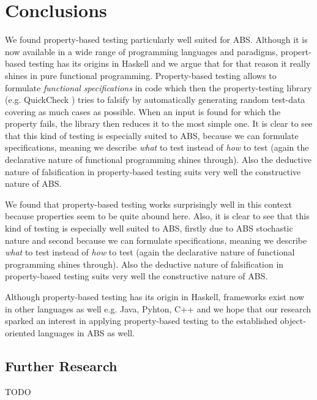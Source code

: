\section{Conclusions}
\label{sec:conclusions}

We found property-based testing particularly well suited for ABS. Although it is now available in a wide range of programming languages and paradigms, propert-based testing has its origins in Haskell \cite{claessen_quickcheck_2000,claessen_testing_2002} and we argue that for that reason it really shines in pure functional programming. Property-based testing allows to formulate \textit{functional specifications} in code which then the property-testing library (e.g. QuickCheck \cite{claessen_quickcheck_2000}) tries to falsify by automatically generating random test-data covering as much cases as possible. When an input is found for which the property fails, the library then reduces it to the most simple one. It is clear to see that this kind of testing is especially suited to ABS, because we can formulate specifications, meaning we describe \textit{what} to test instead of \textit{how} to test (again the declarative nature of functional programming shines through). Also the deductive nature of falsification in property-based testing suits very well the constructive nature of ABS.

We found that property-based testing works surprisingly well in this context because properties seem to be quite abound here. Also, it is clear to see that this kind of testing is especially well suited to ABS, firstly due to ABS stochastic nature and second because we can formulate specifications, meaning we describe \textit{what} to test instead of \textit{how} to test (again the declarative nature of functional programming shines through). Also the deductive nature of falsification in property-based testing suits very well the constructive nature of ABS.

Although property-based testing has its origin in Haskell, frameworks exist now in other languages as well e.g. Java, Pyhton, C++ and we hope that our research sparked an interest in applying property-based testing to the established object-oriented languages in ABS as well. 

\subsection{Further Research}
\label{sec:further}
TODO
